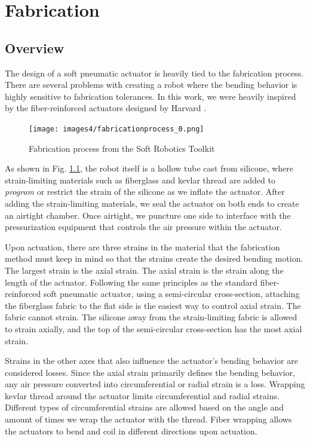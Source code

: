 \chapter{Fabrication}

\section{Overview}
The design of a soft pneumatic actuator is heavily tied to the fabrication process. There are several problems with creating a robot where the bending behavior is highly sensitive to fabrication tolerances. In this work, we were heavily inspired by the fiber-reinforced actuators designed by Harvard \cite{galloway_mechanically_2013}. 

\begin{figure}[ht]
    \centering
    \texttt{[image: images4/fabricationprocess\_0.png]}
    \caption{Fabrication process from the Soft Robotics Toolkit}
    \label{fig:toolkitfab}
\end{figure}

As shown in Fig. \ref{fig:toolkitfab}, the robot itself is a hollow tube cast from silicone, where strain-limiting materials such as fiberglass and kevlar thread are added to \emph{program} or restrict the strain of the silicone as we inflate the actuator. After adding the strain-limiting materials, we seal the actuator on both ends to create an airtight chamber. Once airtight, we puncture one side to interface with the pressurization equipment that controls the air pressure within the actuator. 

Upon actuation, there are three strains in the material that the fabrication method must keep in mind so that the strains create the desired bending motion. The largest strain is the axial strain. The axial strain is the strain along the length of the actuator. Following the same principles as the standard fiber-reinforced soft pneumatic actuator, using a semi-circular cross-section, attaching the fiberglass fabric to the flat side is the easiest way to control axial strain. The fabric cannot strain. The silicone away from the strain-limiting fabric is allowed to strain axially, and the top of the semi-circular cross-section has the most axial strain. 

Strains in the other axes that also influence the actuator's bending behavior are considered losses. Since the axial strain primarily defines the bending behavior, any air pressure converted into circumferential or radial strain is a loss. Wrapping kevlar thread around the actuator limits circumferential and radial strains. Different types of circumferential strains are allowed based on the angle and amount of times we wrap the actuator with the thread. Fiber wrapping allows the actuators to bend and coil in different directions upon actuation. 

